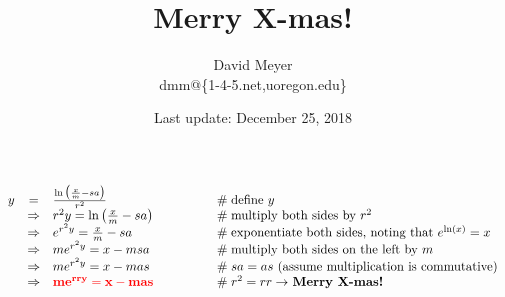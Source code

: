 \documentclass[11pt, oneside]{article}   	%
\title{Merry X-mas!}
\author{David Meyer \\ dmm@\{1-4-5.net,uoregon.edu\}}
\date{Last update: December 25, 2018}							%
\theoremstyle{definition}
\begin{document}
\maketitle


\begin{equation*}
\begin{array}{rcll} 
y
&=& \frac{\ln \big (\frac{x}{m} -  sa  \big ) }{r^2}                                        &\qquad \qquad \mathrel{\#} \text{define $y$}                                                                   \\
&\Rightarrow& r^2 y                          = \ln \big (\frac{x}{m} -  sa  \big )    &\qquad \qquad  \mathrel{\#} \text{multiply both sides by $r^2$}                                       \\
&\Rightarrow& e^{r^2y}                     = \frac{x}{m} -  sa                           &\qquad \qquad \mathrel{\#} \text{exponentiate both sides, noting that $e^{\ln(x)} = x$}  \\
&\Rightarrow& m e^{r^2y}                 = x - msa                                        &\qquad \qquad \mathrel{\#} \text{multiply both sides on the left by $m$}                         \\
&\Rightarrow& m e^{r^2y}                 = x - mas                                        &\qquad \qquad \mathrel{\#} \text{$sa = as$ (assume multiplication is commutative)}      \\
&\Rightarrow& \bf{\color{red}{m e^{rry}  = x - mas}}                                &\qquad \qquad \mathrel{\#} \text{$r^2 = rr \rightarrow$ \bf{Merry X-mas!}}
\end{array}
\end{equation*}
\end{document}
